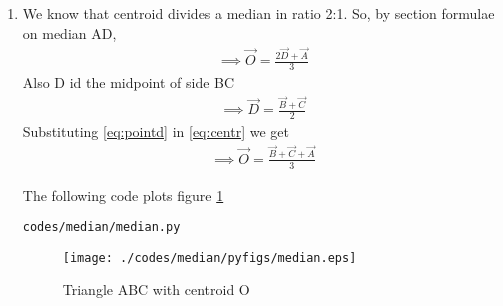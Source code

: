 \renewcommand{\theequation}{\theenumi}
\begin{enumerate}[label=\thesection.\arabic*.,ref=\thesection.\theenumi]

\item We know that centroid divides a median in ratio 2:1. So, by section formulae on median AD,
\begin{align}
\implies \vec{O}=\frac{2\vec{D}+\vec{A}}{3}
\label{eq:centr}
\end{align}
Also D id the midpoint of side BC
\begin{align}
\implies \vec{D}=\frac{\vec{B}+\vec{C}}{2}
\label{eq:pointd}
\end{align}
Substituting \ref{eq:pointd} in \ref{eq:centr} we get
\begin{align}
\implies \vec{O}=\frac{\vec{B}+\vec{C}+\vec{A}}{3}
\end{align}

The following code plots figure \ref{fig:median}
\begin{lstlisting}
codes/median/median.py
\end{lstlisting}
\begin{figure}[!ht]
\centering
\texttt{[image: ./codes/median/pyfigs/median.eps]}
\caption{Triangle ABC with centroid O}
\label{fig:median}
\end{figure}

\end{enumerate}
